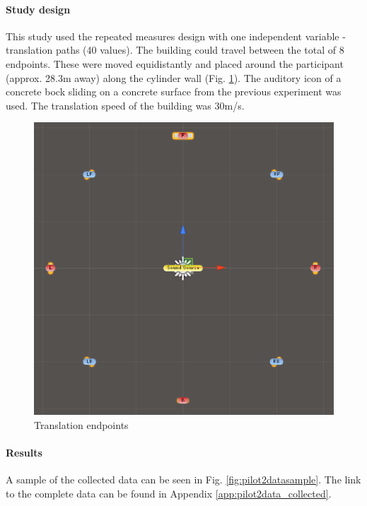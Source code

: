 
\paragraph{Study design}
This study used the repeated measures design with one independent variable - translation paths (40 values).
The building could travel between the total of 8 endpoints. These were moved equidistantly and  placed around the participant (approx. 28.3m away) along the cylinder wall (Fig. \ref{fig:pilot2endpoints}).
The auditory icon of a concrete bock sliding on a concrete surface from the previous experiment was used. The translation speed of the building was 30m/s.

\begin{figure}
	\centering
	\includegraphics[width=0.7\linewidth]{figures/pilot2_endpoints}
	\caption{Translation endpoints}
	\label{fig:pilot2endpoints}
\end{figure}

\paragraph{Results}

A sample of the collected data can be seen in Fig. \ref{fig:pilot2datasample}. The link to the complete data can be found in Appendix \ref{app:pilot2data_collected}.

